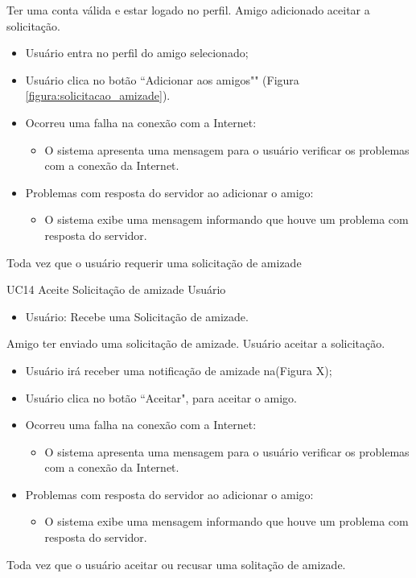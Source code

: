 {Ter uma conta válida e estar logado no perfil.}
{Amigo adicionado aceitar a solicitação.}
{
\begin{itemize}
		\item Usuário entra no perfil do amigo selecionado;
		\item Usuário clica no botão ``Adicionar aos amigos"" (Figura \ref{figura:solicitacao_amizade}).	
\end{itemize}
}
{
\begin{itemize}
	\item Ocorreu uma falha na conexão com a Internet:
	\begin{itemize}
		\item O sistema apresenta uma mensagem para o usuário verificar os problemas com a conexão da Internet.
	\end{itemize}
	
	\item Problemas com resposta do servidor ao adicionar o amigo:
	\begin{itemize}
	\item O sistema exibe uma mensagem informando que houve um problema com resposta do servidor.
	\end{itemize}

\end{itemize}
}
{Toda vez que o usuário requerir uma solicitação de amizade}
{
 
}
\casoDeUso
{UC14}
{Aceite Solicitação de amizade}
{Usuário}
{
\begin{itemize}
	\item Usuário: Recebe uma Solicitação de amizade.
\end{itemize}

}
{Amigo ter enviado uma solicitação de amizade.}
{Usuário aceitar a solicitação.}
{
\begin{itemize}
		\item Usuário irá receber uma notificação de amizade na(Figura X);
		\item Usuário clica no botão ``Aceitar", para aceitar o amigo.
\end{itemize}
}
{
\begin{itemize}
	\item Ocorreu uma falha na conexão com a Internet:
	\begin{itemize}
		\item O sistema apresenta uma mensagem para o usuário verificar os problemas com a conexão da Internet.
	\end{itemize}
	
	\item Problemas com resposta do servidor ao adicionar o amigo:
	\begin{itemize}
	\item O sistema exibe uma mensagem informando que houve um problema com resposta do servidor.
	\end{itemize}

\end{itemize}
}
{Toda vez que o usuário aceitar ou recusar uma solitação de amizade.}
{
 
}

